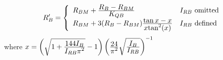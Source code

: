 \begin{equation}
R'_B = \left\{ \begin{array}{ll}
         R_{BM} + {{\textstyle R_B - R_{BM}} \over { \textstyle K_{QB}}}
         & I_{RB} \mbox{ omitted}\\
         R_{BM} + 3(R_B-R_{BM}) {{\textstyle \tan{x} - x} \over
         { \textstyle x\mbox{tan}^2(x)}}
         & I_{RB} \mbox{ defined}
     \end{array} \right. %
\end{equation}
where
$x = {\left( {\textstyle \sqrt{1 + {{\textstyle 144 I_B}\over{\textstyle I_{RB}\pi^2}}}
    -1 } \right)
    \left( {\textstyle {{\textstyle 24}\over{\textstyle\pi^2}}
    \sqrt{{{\textstyle I_B}\over{\textstyle I_{RB}}}}} \right)^{-1} }$\inlineeq

